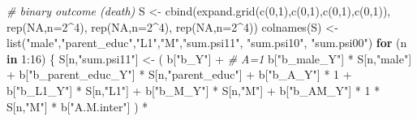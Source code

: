 \documentclass[
]{book}
\newenvironment{Shaded}{\begin{snugshade}}{\end{snugshade}}
\newcommand{\AttributeTok}[1]{\textcolor[rgb]{0.77,0.63,0.00}{#1}}
\newcommand{\CommentTok}[1]{\textcolor[rgb]{0.56,0.35,0.01}{\textit{#1}}}
\newcommand{\ConstantTok}[1]{\textcolor[rgb]{0.00,0.00,0.00}{#1}}
\newcommand{\ControlFlowTok}[1]{\textcolor[rgb]{0.13,0.29,0.53}{\textbf{#1}}}
\newcommand{\DecValTok}[1]{\textcolor[rgb]{0.00,0.00,0.81}{#1}}
\newcommand{\FunctionTok}[1]{\textcolor[rgb]{0.00,0.00,0.00}{#1}}
\newcommand{\NormalTok}[1]{#1}
\newcommand{\OtherTok}[1]{\textcolor[rgb]{0.56,0.35,0.01}{#1}}
\newcommand{\SpecialCharTok}[1]{\textcolor[rgb]{0.00,0.00,0.00}{#1}}
\newcommand{\StringTok}[1]{\textcolor[rgb]{0.31,0.60,0.02}{#1}}
\begin{document}
\begin{Shaded}
\begin{Highlighting}[]
  \CommentTok{\# binary outcome (death)}
\NormalTok{  S }\OtherTok{\textless{}{-}} \FunctionTok{cbind}\NormalTok{(}\FunctionTok{expand.grid}\NormalTok{(}\FunctionTok{c}\NormalTok{(}\DecValTok{0}\NormalTok{,}\DecValTok{1}\NormalTok{),}\FunctionTok{c}\NormalTok{(}\DecValTok{0}\NormalTok{,}\DecValTok{1}\NormalTok{),}\FunctionTok{c}\NormalTok{(}\DecValTok{0}\NormalTok{,}\DecValTok{1}\NormalTok{),}\FunctionTok{c}\NormalTok{(}\DecValTok{0}\NormalTok{,}\DecValTok{1}\NormalTok{)), }\FunctionTok{rep}\NormalTok{(}\ConstantTok{NA}\NormalTok{,}\AttributeTok{n=}\DecValTok{2}\SpecialCharTok{\^{}}\DecValTok{4}\NormalTok{), }
             \FunctionTok{rep}\NormalTok{(}\ConstantTok{NA}\NormalTok{,}\AttributeTok{n=}\DecValTok{2}\SpecialCharTok{\^{}}\DecValTok{4}\NormalTok{), }\FunctionTok{rep}\NormalTok{(}\ConstantTok{NA}\NormalTok{,}\AttributeTok{n=}\DecValTok{2}\SpecialCharTok{\^{}}\DecValTok{4}\NormalTok{))}
  \FunctionTok{colnames}\NormalTok{(S) }\OtherTok{\textless{}{-}} \FunctionTok{list}\NormalTok{(}\StringTok{"male"}\NormalTok{,}\StringTok{"parent\_educ"}\NormalTok{,}\StringTok{"L1"}\NormalTok{,}\StringTok{"M"}\NormalTok{,}\StringTok{"sum.psi11"}\NormalTok{, }
                      \StringTok{"sum.psi10"}\NormalTok{, }\StringTok{"sum.psi00"}\NormalTok{)}
  \ControlFlowTok{for}\NormalTok{ (n }\ControlFlowTok{in} \DecValTok{1}\SpecialCharTok{:}\DecValTok{16}\NormalTok{) \{}
\NormalTok{    S[n,}\StringTok{"sum.psi11"}\NormalTok{] }\OtherTok{\textless{}{-}}\NormalTok{  ( b[}\StringTok{"b\_Y"}\NormalTok{] }\SpecialCharTok{+}                                           \CommentTok{\# A=1}
\NormalTok{                             b[}\StringTok{"b\_male\_Y"}\NormalTok{] }\SpecialCharTok{*}\NormalTok{ S[n,}\StringTok{"male"}\NormalTok{] }\SpecialCharTok{+} 
\NormalTok{                             b[}\StringTok{"b\_parent\_educ\_Y"}\NormalTok{] }\SpecialCharTok{*}\NormalTok{ S[n,}\StringTok{"parent\_educ"}\NormalTok{] }\SpecialCharTok{+} 
\NormalTok{                             b[}\StringTok{"b\_A\_Y"}\NormalTok{] }\SpecialCharTok{*} \DecValTok{1} \SpecialCharTok{+} 
\NormalTok{                             b[}\StringTok{"b\_L1\_Y"}\NormalTok{] }\SpecialCharTok{*}\NormalTok{ S[n,}\StringTok{"L1"}\NormalTok{] }\SpecialCharTok{+}
\NormalTok{                             b[}\StringTok{"b\_M\_Y"}\NormalTok{] }\SpecialCharTok{*}\NormalTok{ S[n,}\StringTok{"M"}\NormalTok{] }\SpecialCharTok{+}
\NormalTok{                             b[}\StringTok{"b\_AM\_Y"}\NormalTok{] }\SpecialCharTok{*} \DecValTok{1} \SpecialCharTok{*}\NormalTok{ S[n,}\StringTok{"M"}\NormalTok{] }\SpecialCharTok{*}\NormalTok{ b[}\StringTok{"A.M.inter"}\NormalTok{] ) }\SpecialCharTok{*}

\end{Highlighting}
\end{Shaded}
\end{document}

